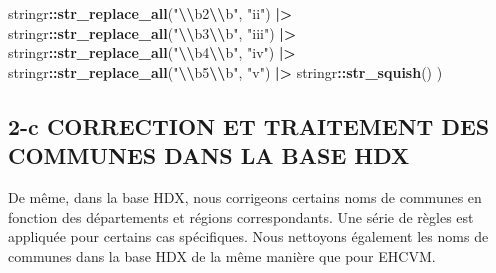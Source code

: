\documentclass[
]{article}
\newenvironment{Shaded}{\begin{snugshade}}{\end{snugshade}}
\newcommand{\FunctionTok}[1]{\textcolor[rgb]{0.13,0.29,0.53}{\textbf{#1}}}
\newcommand{\NormalTok}[1]{#1}
\newcommand{\SpecialCharTok}[1]{\textcolor[rgb]{0.81,0.36,0.00}{\textbf{#1}}}
\newcommand{\StringTok}[1]{\textcolor[rgb]{0.31,0.60,0.02}{#1}}
\begin{document}
\begin{Shaded}
\begin{Highlighting}[]
\NormalTok{      stringr}\SpecialCharTok{::}\FunctionTok{str\_replace\_all}\NormalTok{(}\StringTok{"}\SpecialCharTok{\textbackslash{}\textbackslash{}}\StringTok{b2}\SpecialCharTok{\textbackslash{}\textbackslash{}}\StringTok{b"}\NormalTok{, }\StringTok{"ii"}\NormalTok{) }\SpecialCharTok{|\textgreater{}}
\NormalTok{      stringr}\SpecialCharTok{::}\FunctionTok{str\_replace\_all}\NormalTok{(}\StringTok{"}\SpecialCharTok{\textbackslash{}\textbackslash{}}\StringTok{b3}\SpecialCharTok{\textbackslash{}\textbackslash{}}\StringTok{b"}\NormalTok{, }\StringTok{"iii"}\NormalTok{) }\SpecialCharTok{|\textgreater{}}
\NormalTok{      stringr}\SpecialCharTok{::}\FunctionTok{str\_replace\_all}\NormalTok{(}\StringTok{"}\SpecialCharTok{\textbackslash{}\textbackslash{}}\StringTok{b4}\SpecialCharTok{\textbackslash{}\textbackslash{}}\StringTok{b"}\NormalTok{, }\StringTok{"iv"}\NormalTok{) }\SpecialCharTok{|\textgreater{}}
\NormalTok{      stringr}\SpecialCharTok{::}\FunctionTok{str\_replace\_all}\NormalTok{(}\StringTok{"}\SpecialCharTok{\textbackslash{}\textbackslash{}}\StringTok{b5}\SpecialCharTok{\textbackslash{}\textbackslash{}}\StringTok{b"}\NormalTok{, }\StringTok{"v"}\NormalTok{) }\SpecialCharTok{|\textgreater{}}
\NormalTok{      stringr}\SpecialCharTok{::}\FunctionTok{str\_squish}\NormalTok{()}
\NormalTok{  )}
\end{Highlighting}
\end{Shaded}

\subsection{2-c CORRECTION ET TRAITEMENT DES COMMUNES DANS LA BASE
HDX}\label{c-correction-et-traitement-des-communes-dans-la-base-hdx}

De même, dans la base HDX, nous corrigeons certains noms de communes en
fonction des départements et régions correspondants. Une série de règles
est appliquée pour certains cas spécifiques. Nous nettoyons également
les noms de communes dans la base HDX de la même manière que pour EHCVM.
\end{document}
